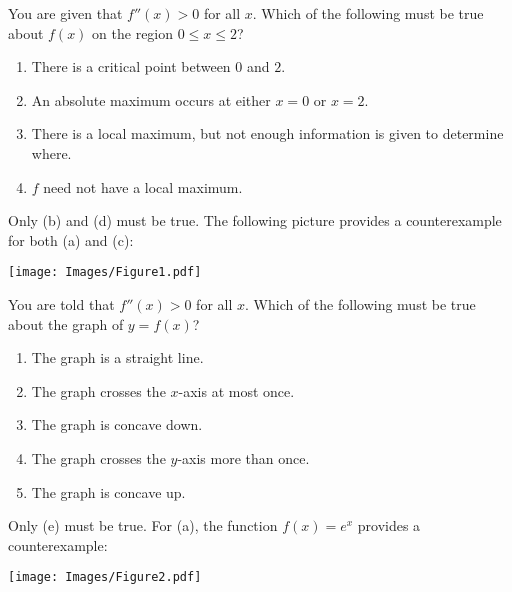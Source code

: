 \documentclass[handout,nooutcomes]{ximera}
\renewenvironment{freeResponse}{
\ifhandout\setbox0\vbox\bgroup\else
\begin{trivlist}\item[\hskip \labelsep\bfseries Solution:\hspace{2ex}]
\fi}
{\ifhandout\egroup\else
\end{trivlist}
\fi}
\begin{document}
\begin{problem}
  \mbox{}
  \begin{enumerate}
    \item[1.]
      You are given that $f''(x) > 0$ for all $x$.
      Which of the following must be true about $f(x)$ on the region $0 \leq x \leq 2$?
      \begin{enumerate}
        \item
          There is a critical point between $0$ and $2$.

        \item
          An absolute maximum occurs at either $x=0$ or $x=2$.

        \item
          There is a local maximum, but not enough information is given to determine where.

        \item
          $f$ need not have a local maximum.
      \end{enumerate}
      \begin{freeResponse}
        Only (b) and (d) must be true.
        The following picture provides a counterexample for both (a) and (c):
        \begin{image}
          \texttt{[image: Images/Figure1.pdf]}
        \end{image}
      \end{freeResponse}
		
     \item[2.]  
       You are told that $f''(x) > 0$ for all $x$.
       Which of the following must be true about the graph of $y=f(x)$?
       \begin{enumerate}
         \item
           The graph is a straight line.

         \item 
           The graph crosses the $x$-axis at most once.
         
         \item
           The graph is concave down.

         \item
           The graph crosses the $y$-axis more than once.

         \item
           The graph is concave up.
       \end{enumerate}
       \begin{freeResponse}
         Only (e) must be true.
         For (a), the function $f(x) = e^x$ provides a counterexample:
         \begin{image}
           \texttt{[image: Images/Figure2.pdf]}
         \end{image}
			

\end{freeResponse}
\end{enumerate}
\end{problem}
\end{document}
